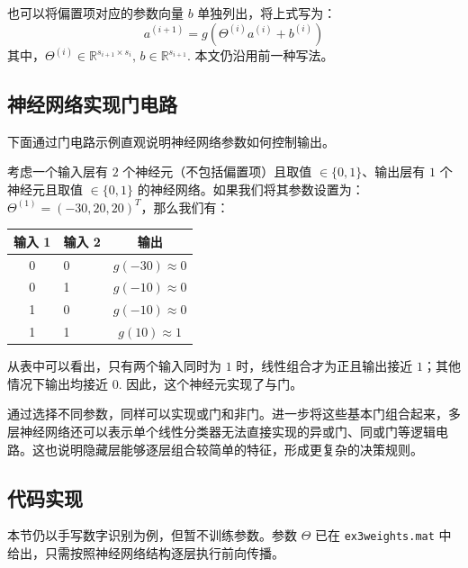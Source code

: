 \begin{note}
也可以将偏置项对应的参数向量 $b$ 单独列出，将上式写为：
\[
a^{(i+1)}=g\left(\Theta^{(i)}a^{(i)}+b^{(i)}\right)
\]
其中，$\Theta^{(i)}\in\mathbb R^{s_{i+1}\times s_i},\,b\in\mathbb R^{s_{i+1}}$. 本文仍沿用前一种写法。
\end{note}


\subsection{神经网络实现门电路}

下面通过门电路示例直观说明神经网络参数如何控制输出。

考虑一个输入层有 $2$ 个神经元（不包括偏置项）且取值 $\in\{0,1\}$、输出层有 $1$ 个神经元且取值 $\in\{0,1\}$ 的神经网络。如果我们将其参数设置为：$\Theta^{(1)}=(-30,20,20)^T$，那么我们有：

\begin{table}[H]
    \centering
    \begin{tabularx}{0.4\linewidth}{cYc}
      \toprule
      输入 1 & 输入 2 & 输出 \\
       & 0 & $g(-30)\approx 0$ \\
      0 & 1 & $g(-10)\approx 0$ \\
      1 & 0 & $g(-10)\approx 0$ \\
      1 & 1 & $g(10)\approx 1$  \\
      \bottomrule
    \end{tabularx}
\end{table}

从表中可以看出，只有两个输入同时为 $1$ 时，线性组合才为正且输出接近 $1$；其他情况下输出均接近 $0$. 因此，这个神经元实现了与门。

通过选择不同参数，同样可以实现或门和非门。进一步将这些基本门组合起来，多层神经网络还可以表示单个线性分类器无法直接实现的异或门、同或门等逻辑电路。这也说明隐藏层能够逐层组合较简单的特征，形成更复杂的决策规则。


\subsection{代码实现}

本节仍以手写数字识别为例，但暂不训练参数。参数 $\Theta$ 已在 \texttt{ex3weights.mat} 中给出，只需按照神经网络结构逐层执行前向传播。

